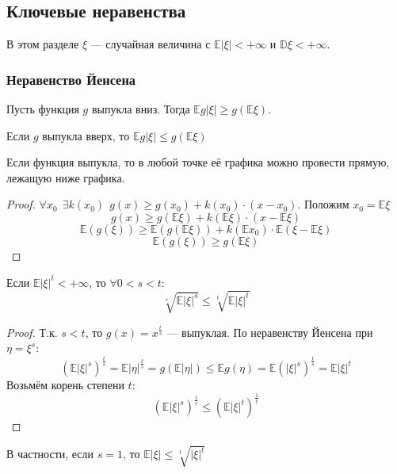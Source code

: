 \subsection{Ключевые неравенства}

В этом разделе \(\xi\) --- случайная величина с \(\mathbb{E}|\xi| < +\infty\) и \(\mathbb{D}\xi < +\infty\).

\subsubsection{Неравенство Йенсена}

\begin{theorem}
    Пусть функция \(g\) выпукла вниз. Тогда \(\mathbb{E}g|\xi| \geq g(\mathbb{E}\xi)\).

    Если \(g\) выпукла вверх, то \(\mathbb{E}g|\xi| \leq g(\mathbb{E}\xi)\)

    \begin{remark}
        Если функция выпукла, то в любой точке её графика можно провести прямую, лежащую ниже графика.
    \end{remark}
\end{theorem}
\begin{proof}
    \(\forall x_0 \ \ \exists k(x_0) \ \ g(x) \geq g(x_0) + k(x_0) \cdot (x - x_0)\). Положим \(x_0 = \mathbb{E}\xi\)
    \[g(x) \geq g(\mathbb{E}\xi) + k(\mathbb{E}\xi) \cdot (x - \mathbb{E}\xi)\]
    \[\mathbb{E}(g(\xi)) \geq \mathbb{E}(g(\mathbb{E}\xi)) + k(\mathbb{E}x_0) \cdot \mathbb{E}(\xi - \mathbb{E}\xi)\]
    \[\mathbb{E}(g(\xi)) \geq g(\mathbb{E}\xi)\]
\end{proof}

\begin{corollary}
    Если \(\mathbb{E}|\xi|^t < +\infty\), то \(\forall 0 < s < t\):
    \[\sqrt[s]{\mathbb{E}|\xi|^s} \leq \sqrt[t]{\mathbb{E}|\xi|^t}\]
\end{corollary}
\begin{proof}
    Т.к. \(s < t\), то \(g(x) = x^{\frac{t}{s}}\) --- выпуклая. По неравенству Йенсена при \(\eta = \xi^s\):
    \[(\mathbb{E}|\xi|^s)^{\frac{t}{s}} = \mathbb{E}|\eta|^{\frac{t}{s}} = g(\mathbb{E}|\eta|) \leq \mathbb{E} g(\eta) = \mathbb{E}(|\xi|^s)^{\frac{t}{s}} = \mathbb{E}|\xi|^t\]
    Возьмём корень степени \(t\):
    \[(\mathbb{E}|\xi|^s)^{\frac{1}{s}} \leq (\mathbb{E}|\xi|^{t})^{\frac{1}{t}}\]
\end{proof}
В частности, если \(s = 1\), то \(\mathbb{E}|\xi| \leq \sqrt[t]{|\xi|^t}\)

